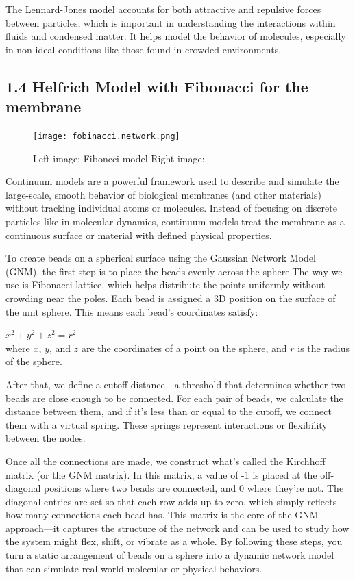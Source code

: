 \documentclass[12pt]{article}
\begin{document}
\begin{flushleft}
The Lennard-Jones model accounts for both attractive and repulsive forces between particles, which is important in understanding the interactions within fluids and condensed matter. It helps model the behavior of molecules, especially in non-ideal conditions like those found in crowded environments. 

\subsection*{1.4 Helfrich Model with Fibonacci for the membrane}
\begin{figure}[!ht]
  \centering
  \texttt{[image: fobinacci.network.png]} 
  \caption{Left image: Fiboncci model  Right image: }
\end{figure}

Continuum models are a powerful framework used to describe and simulate the large-scale, smooth behavior of biological membranes (and other materials) without tracking individual atoms or molecules. Instead of focusing on discrete particles like in molecular dynamics, continuum models treat the membrane as a continuous surface or material with defined physical properties.



To create beads on a spherical surface using the Gaussian Network Model (GNM), the first step is to place the beads evenly across the sphere.The way we use is Fibonacci lattice, which helps distribute the points uniformly without crowding near the poles.
Each bead is assigned a 3D position on the surface of the unit sphere. This means each bead's coordinates satisfy:

\(x^2 + y^2 +z^2 = r^2\)\\
\noindent where \(x\), \(y\), and \(z\) are the coordinates of a point on the sphere, and \(r\) is the radius of the sphere.
 
 
 
 
 
  After that, we define a cutoff distance—a threshold that determines whether two beads are close enough to be connected. For each pair of beads, we calculate the distance between them, and if it’s less than or equal to the cutoff, we connect them with a virtual spring. These springs represent interactions or flexibility between the nodes. 
  
	Once all the connections are made, we construct what's called the Kirchhoff matrix (or the GNM matrix). In this matrix, a value of -1 is placed at the off-diagonal positions where two beads are connected, and 0 where they're not. The diagonal entries are set so that each row adds up to zero, which simply reflects how many connections each bead has. This matrix is the core of the GNM approach—it captures the structure of the network and can be used to study how the system might flex, shift, or vibrate as a whole. By following these steps, you turn a static arrangement of beads on a sphere into a dynamic network model that can simulate real-world molecular or physical behaviors.








\end{flushleft}
\end{document}
